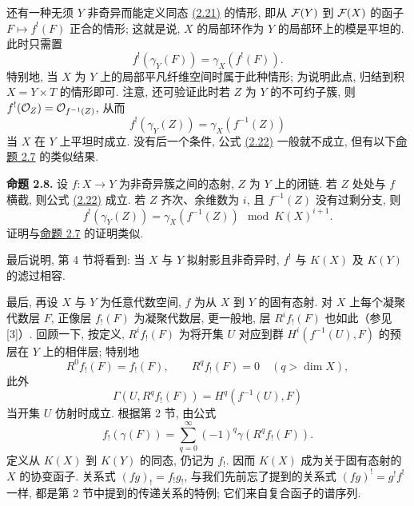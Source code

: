 还有一种无须 $Y$ 非奇异而能定义同态 \hyperlink{sga6.e00.eq.2-21}{(2.21)} 的情形, 即从 $\mathcal F(Y)$ 到 $\mathcal F(X)$ 的函子 $F\mapsto f^!(F)$ 正合的情形; 这就是说, $X$ 的局部环作为 $Y$ 的局部环上的模是平坦的. 此时只需置
\[
 f^!(\gamma_Y(F))=\gamma_X(f^!(F)).
\]
特别地, 当 $X$ 为 $Y$ 上的局部平凡纤维空间时属于此种情形; 为说明此点, 归结到积 $X=Y\times T$ 的情形即可. 注意, 还可验证此时若 $Z$ 为 $Y$ 的不可约子簇, 则 $f^!(\mathcal O_Z)=\mathcal O_{f^{-1}(Z)}$, 从而
\begin{equation}\tag{2.22}
 f^!(\gamma_Y(Z))=\gamma_X(f^{-1}(Z))
\end{equation}
当 $X$ 在 $Y$ 上平坦时成立. 没有后一个条件, 公式 \hyperlink{sga6.e00.eq.2-22}{(2.22)} 一般就不成立, 但有以下\hyperlink{sga6.e00.prop.2-7}{命题 2.7} 的类似结果.

\textbf{命题 2.8.} 设 $f:X\to Y$ 为非奇异簇之间的态射, $Z$ 为 $Y$ 上的闭链. 若 $Z$ 处处与 $f$ 横截, 则公式 \hyperlink{sga6.e00.eq.2-22}{(2.22)} 成立. 若 $Z$ 齐次、余维数为 $i$, 且 $f^{-1}(Z)$ 没有过剩分支, 则
\begin{equation}\tag{2.23}
 f^!(\gamma_Y(Z))=\gamma_X(f^{-1}(Z))\mod K(X)^{i+1}.
\end{equation}
证明与\hyperlink{sga6.e00.prop.2-7}{命题 2.7} 的证明类似.

最后说明, 第 4 节将看到: 当 $X$ 与 $Y$ 拟射影且非奇异时, $f^!$ 与 $K(X)$ 及 $K(Y)$ 的滤过相容.

最后, 再设 $X$ 与 $Y$ 为任意代数空间, $f$ 为从 $X$ 到 $Y$ 的固有态射. 对 $X$ 上每个凝聚代数层 $F$, 正像层 $f_!(F)$ 为凝聚代数层, 更一般地, 层 $R^if_!(F)$ 也如此（参见 [3]）. 回顾一下, 按定义, $R^if_!(F)$ 为将开集 $U$ 对应到群 $H^i(f^{-1}(U),F)$ 的预层在 $Y$ 上的相伴层; 特别地
\begin{equation}\tag{2.24}
 R^0f_!(F)=f_!(F),\qquad R^qf_!(F)=0\quad(q>\dim X),
\end{equation}
此外
\begin{equation}\tag{2.25}
 \Gamma(U,R^qf_!(F))=H^q(f^{-1}(U),F)
\end{equation}
当开集 $U$ 仿射时成立. 根据第 2 节, 由公式
\begin{equation}\tag{2.26}
 f_!(\gamma(F))=\sum_{q=0}^{\infty}(-1)^q\gamma(R^qf_!(F)).
\end{equation}
定义从 $K(X)$ 到 $K(Y)$ 的同态, 仍记为 $f_!$. 因而 $K(X)$ 成为关于固有态射的 $X$ 的协变函子. 关系式 $(fg)_!=f_!g_!$, 与我们先前忘了提到的关系式 $(fg)^!=g^!f^!$ 一样, 都是第 2 节中提到的传递关系的特例; 它们来自复合函子的谱序列.

